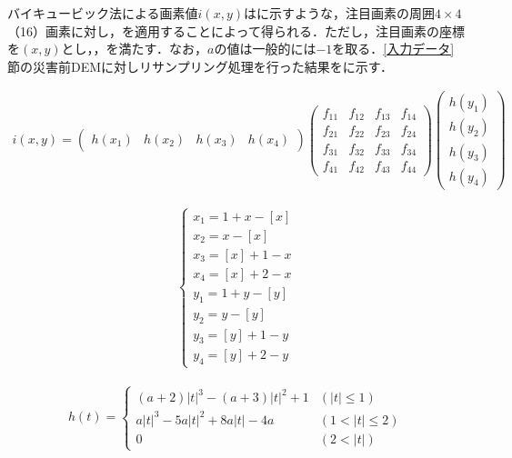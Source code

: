       バイキュービック法による画素値$i(x,y)$はに示すような，注目画素の周囲$4\times4$（16）画素に対し，を適用することによって得られる．ただし，注目画素の座標を$(x,y)$とし，，を満たす．なお，$a$の値は一般的には$-1$を取る．\ref{入力データ}節の災害前DEMに対しリサンプリング処理を行った結果をに示す．

      \begin{eqnarray}
        \label{バイキュービック法1}
        i(x,y) = 
        \begin{pmatrix}
        h(x_{1}) & h(x_{2}) & h(x_{3}) & h(x_{4})
        \end{pmatrix}
        \begin{pmatrix}
          f_{11} & f_{12} & f_{13} & f_{14} \\
          f_{21} & f_{22} & f_{23} & f_{24} \\
          f_{31} & f_{32} & f_{33} & f_{34} \\
          f_{41} & f_{42} & f_{43} & f_{44}
        \end{pmatrix}
        \begin{pmatrix}
          h(y_{1}) \\ h(y_{2}) \\ h(y_{3}) \\ h(y_{4})
        \end{pmatrix}
      \end{eqnarray}
  
      \begin{eqnarray}
        \label{バイキュービック法2}
        \left\{
          \begin{array}{l}
            x_{1} = 1 + x - [x] \\
            x_{2} = x - [x]     \\
            x_{3} = [x] + 1 - x \\
            x_{4} = [x] + 2 - x \\
            y_{1} = 1 + y - [y] \\
            y_{2} = y - [y]     \\
            y_{3} = [y] + 1 - y \\
            y_{4} = [y] + 2 - y
          \end{array}
        \right.
      \end{eqnarray}

      \begin{eqnarray}
        \label{バイキュービック法3}
        h(t) = 
        \left\{
          \begin{array}{ll}
            (a + 2) |t|^3 - (a + 3)|t|^2 + 1 & (|t| \leq 1)   \\
            a|t|^3 - 5a|t|^2 + 8a|t| - 4a    & (1 < |t| \leq 2) \\
            0                                & (2 < |t|)
          \end{array}
        \right.
      \end{eqnarray}

